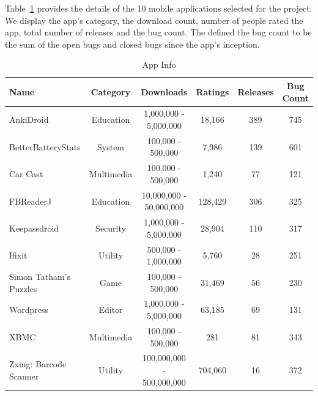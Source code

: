 \documentclass{sig-alternate}
\begin{document}

 
Table~\ref{Table:appInfo} provides the details of the 10 mobile applications selected for the project. We display the app's category, the download count, number of people rated the app, total number of releases and the bug count. The defined the bug count to be the sum of the open bugs and closed bugs since the app's inception.


\begin{table}
\begin{center}
\caption{App Info}
\label{Table:appInfo}
  \begin{tabular}{ | l | c | c | c | c | c | } \hline

     \bfseries Name  & \bfseries Category & \bfseries Downloads & \bfseries Ratings & \bfseries Releases & \bfseries Bug Count \\ \hline
    
    	AnkiDroid & Education & 1,000,000 - 5,000,000 & 18,166 & 389 & 745 \\ \hline
    	BetterBatteryStats & System & 100,000 - 500,000 & 7,986 & 139 & 601 \\ \hline
	Car Cast & Multimedia & 100,000 - 500,000 & 1,240 & 77 & 121 \\ \hline
 	FBReaderJ & Education & 10,000,000 - 50,000,000 & 128,429 & 306 & 325 \\ \hline
	Keepassdroid & Security & 1,000,000 - 5,000,000 & 28,904 & 110 & 317 \\ \hline
	Ifixit & Utility & 500,000 - 1,000,000 & 5,760 & 28 & 251 \\ \hline
	Simon Tatham's Puzzles & Game & 100,000 - 500,000 & 31,469 & 56 & 230 \\ \hline	
	Wordpress & Editor & 1,000,000 - 5,000,000 & 63,185 & 69 & 131 \\ \hline
	XBMC & Multimedia & 100,000 - 500,000 & 281 & 81 & 343 \\ \hline
	Zxing: Barcode Scanner & Utility & 100,000,000 - 500,000,000 & 704,060 & 16 & 372 \\ \hline	
 
  \end{tabular}
  \end{center}
\end{table}
\end{document}
